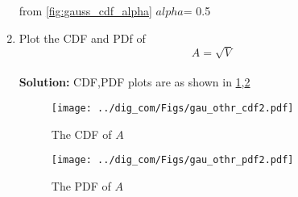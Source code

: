 \documentclass{article}
\numberwithin{equation}{subsection}
\numberwithin{figure}{subsection}
\newcommand{\solution}{\noindent \textbf{Solution: }}
\renewcommand\thesection{\arabic{section}}
\renewcommand\thesubsection{\thesection.\arabic{subsection}}
\begin{document}
\begin{enumerate}[label=\thesubsection.\arabic*,ref=\thesubsection.\arabic{figure}]
\begin{figure}
\end{figure}
from \ref{fig:gauss_cdf_alpha}
$alpha$= 0.5
\item
\label{ch3_raleigh_sim}
Plot the CDF and PDf of
%
\begin{equation}
A = \sqrt{V}
\end{equation}\\
\solution
CDF,PDF plots are as shown in \ref{fig:gauss_othr_cdf2},\ref{fig:gauss_othr_pdf2}
\begin{center}
\end{center}
\begin{center}
\end{center}
\begin{figure}
\centering
\texttt{[image: ../dig\_com/Figs/gau\_othr\_cdf2.pdf]}     
\caption{The CDF of $A$ }
\label{fig:gauss_othr_cdf2}
\end{figure}
\begin{figure}
\centering
\texttt{[image: ../dig\_com/Figs/gau\_othr\_pdf2.pdf]}     
\caption{The PDF of $A$ }
\label{fig:gauss_othr_pdf2}
\end{figure}
\end{enumerate}
\end{document}
